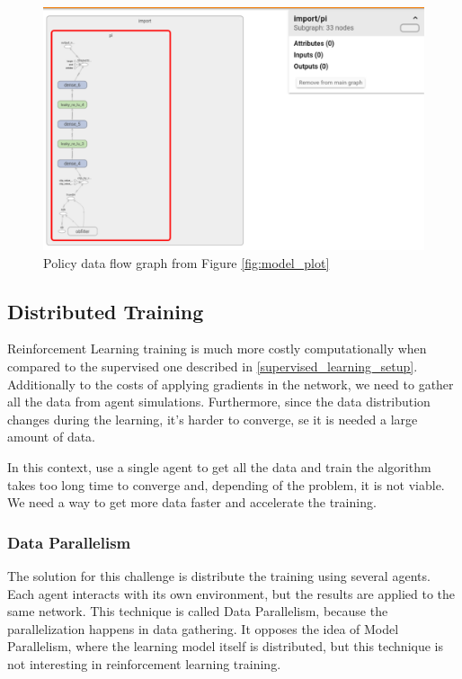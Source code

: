 \begin{figure}[!htbp]
	\centering
	\includegraphics[width=1.1\textwidth]{Cap5/policygraph2.eps}
	\caption{ Policy data flow graph from Figure \ref{fig:model_plot}
	}
	\label{fig:policygraph2}
\end{figure}


\subsection{Distributed Training}
Reinforcement Learning training is much more costly computationally when compared to the supervised one described in \ref{supervised_learning_setup}. Additionally to the costs of applying gradients in the network, we need to gather all the data from agent simulations. Furthermore, since the data distribution changes during the learning, it's harder to converge, se it is needed a large amount of data.

In this context, use a single agent to get all the data and train the algorithm takes too long time to converge and, depending of the problem, it is not viable. We need a way to get more data faster and accelerate the training.

\subsubsection{Data Parallelism}

The solution for this challenge is distribute the training using several agents. Each agent interacts with its own environment, but the results are applied to the same network. This technique is called Data Parallelism, because the parallelization happens in data gathering. It opposes the idea of Model Parallelism, where the learning model itself is distributed, but this technique is not interesting in reinforcement learning training.

